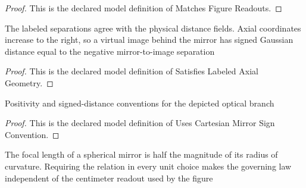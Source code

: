 \begin{proof}
  This is the declared model definition of Matches Figure Readouts.
\end{proof}
\begin{definition}
  \label{def:physics:phyx-mini-0059:phyxminiproblems-problemphyxmini0059-satisfieslabeledaxialgeometry}
  The labeled separations agree with the physical distance fields. Axial coordinates increase to the right, so a virtual image behind the mirror has signed Gaussian distance equal to the negative mirror-to-image separation
\end{definition}
\begin{proof}
  This is the declared model definition of Satisfies Labeled Axial Geometry.
\end{proof}
\begin{definition}
  \label{def:physics:phyx-mini-0059:phyxminiproblems-problemphyxmini0059-usescartesianmirrorsignconvention}
  Positivity and signed-distance conventions for the depicted optical branch
\end{definition}
\begin{proof}
  This is the declared model definition of Uses Cartesian Mirror Sign Convention.
\end{proof}
\begin{definition}
  \label{def:physics:phyx-mini-0059:phyxminiproblems-problemphyxmini0059-satisfiessphericalmirrorfocallaw}
  The focal length of a spherical mirror is half the magnitude of its radius of curvature. Requiring the relation in every unit choice makes the governing law independent of the centimeter readout used by the figure
\end{definition}
